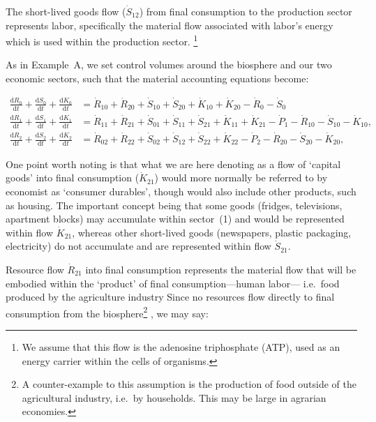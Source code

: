 

The short-lived goods flow ($\dot{S}_{12}$)
from final consumption to the production sector 
represents labor,
specifically  the material flow 
associated with labor's energy 
which is used within the production sector.
\footnote{We assume that this flow is the 
adenosine triphosphate (ATP), 
used as an energy
carrier within the cells of organisms.} 

As in Example~A, 
we set control volumes around the biosphere 
and our two economic sectors, 
such that the material accounting equations become:

\begin{align} 
\label{eq:B_CV_0}
	\frac{\mathrm{d}R_{0}}{\mathrm{d}t} 
	+ \frac{\mathrm{d}S_{0}}{\mathrm{d}t}	
	+ \frac{\mathrm{d}K_0}{\mathrm{d}t}		&
	=  \dot{R}_{10} + \dot{R}_{20} 
	+ \dot{S}_{10} + \dot{S}_{20} 
	+ \dot{K}_{10} + \dot{K}_{20} 
	- \dot{R}_{0} 
	- \dot{S}_{0} 							\\
\label{eq:B_CV_1}
	\frac{\mathrm{d}R_{1}}{\mathrm{d}t} 
	+ \frac{\mathrm{d}S_{1}}{\mathrm{d}t}	
	+ \frac{\mathrm{d}K_{1}}{\mathrm{d}t}	&
	=  \dot{R}_{11} 
	+ \dot{R}_{21}
	+ \dot{S}_{01} 
	+ \dot{S}_{11} 
	+ \dot{S}_{21}
	+ \dot{K}_{11}
	+ \dot{K}_{21}
	- \dot{P}_{1} 
	- \dot{R}_{10} 
	- \dot{S}_{10} 
	- \dot{K}_{10},							\\
\label{eq:B_CV_2}
	\frac{\mathrm{d}R_{2}}{\mathrm{d}t} 
	+ \frac{\mathrm{d}S_{2}}{\mathrm{d}t}
	+ \frac{\mathrm{d}K_{2}}{\mathrm{d}t}	&
	=  \dot{R}_{02} 
	+ \dot{R}_{22} 
	+ \dot{S}_{02} 
	+ \dot{S}_{12} 
	+ \dot{S}_{22} 
	+ \dot{K}_{22}
	- \dot{P}_{2}
	- \dot{R}_{20} 
	- \dot{S}_{20} 
	- \dot{K}_{20},
\end{align}

One point worth noting is that 
what we are here denoting as a flow of 
`capital goods'
into final consumption ($\dot{K}_{21}$) 
would more normally be referred to by economist as 
`consumer durables', 
though would also include other products, 
such as housing. 
The important concept being that some goods 
(fridges, televisions, apartment blocks) 
may accumulate within sector~(1)
and would be represented within flow 
$\dot{K}_{21}$, 
whereas other short-lived goods
(newspapers, plastic packaging, electricity) 
do not accumulate and are represented within flow 
$\dot{S}_{21}$.

Resource flow $\dot{R}_{21}$ 
into final consumption represents 
the material flow that will be embodied within the 
`product' of final consumption---human labor---
i.e.\ food produced by the agriculture industry
Since no resources flow directly to final consumption 
from the biosphere\footnote{A counter-example
to this assumption is the production of food
outside of the agricultural industry, 
i.e.\ by households. 
This may be large in agrarian economies.}
, we may say:

